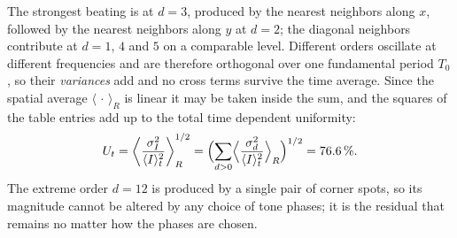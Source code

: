 The strongest beating is at $d=3$, produced by the nearest neighbors along $x$,
followed by the nearest neighbors along $y$ at $d=2$; the diagonal neighbors
contribute at $d=1$, $4$ and $5$ on a comparable level. Different orders
oscillate at different frequencies and are therefore orthogonal over one
fundamental period $T_0$, so their \emph{variances} add and no cross terms
survive the time average. Since the spatial average $\langle\,\cdot\,\rangle_R$
is linear it may be taken inside the sum, and the squares of the table entries
add up to the total time dependent uniformity:
\begin{equation}
U_t=\left\langle\frac{\sigma_I^2}{\langle I\rangle_t^2}\right\rangle_R^{1/2}
=\Bigl(\sum_{d>0}\Bigl\langle\frac{\sigma_d^2}{\langle I\rangle_t^2}
\Bigr\rangle_R\Bigr)^{1/2}
=76.6\,\% .
\end{equation}
The extreme order $d=12$ is produced by a single pair of corner spots, so its
magnitude cannot be altered by any choice of tone phases; it is the residual
that remains no matter how the phases are chosen.
